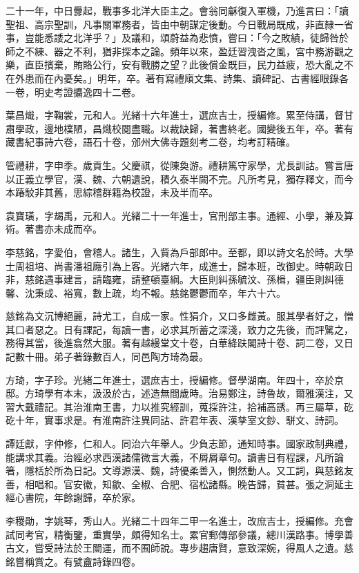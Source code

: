 \begin{pinyinscope}
二十一年，中日釁起，戰事多北洋大臣主之。會翁同龢復入軍機，乃進言曰：「讀聖祖、高宗聖訓，凡事關軍務者，皆由中朝謀定後動。今日戰局既成，非直隸一省事，豈能悉諉之北洋乎？」及議和，頌蔚益為悲憤，嘗曰：「今之敗績，徒歸咎於師之不練、器之不利，猶非探本之論。頻年以來，盈廷習洩沓之風，宮中務游觀之樂，直臣擯棄，賄賂公行，安有戰勝之望？此後償金既巨，民力益疲，恐大亂之不在外患而在內憂矣。」明年，卒。著有寫禮廎文集、詩集、讀碑記、古書經眼錄各一卷，明史考證攟逸四十二卷。

葉昌熾，字鞠裳，元和人。光緒十六年進士，選庶吉士，授編修。累至侍講，督甘肅學政，邊地樸陋，昌熾校閱盡職。以裁缺歸，著書終老。國變後五年，卒。著有藏書紀事詩六卷，語石十卷，邠州大佛寺題刻考二卷，均考訂精確。

管禮耕，字申季。歲貢生。父慶祺，從陳奐游。禮耕篤守家學，尤長訓詁。嘗言唐以正義立學官，漢、魏、六朝遺說，積久泰半闕不完。凡所考見，獨存釋文，而今本踳駮非其舊，思綜稽群籍為校證，未及半而卒。

袁寶璜，字朅禹，元和人。光緒二十一年進士，官刑部主事。通經、小學，兼及算術。著書亦未成而卒。

李慈銘，字愛伯，會稽人。諸生，入貲為戶部郎中。至都，即以詩文名於時。大學士周祖培、尚書潘祖廕引為上客。光緒六年，成進士，歸本班，改御史。時朝政日非，慈銘遇事建言，請臨雍，請整頓臺綱。大臣則糾孫毓汶、孫楫，疆臣則糾德馨、沈秉成、裕寬，數上疏，均不報。慈銘鬱鬱而卒，年六十六。

慈銘為文沉博絕麗，詩尤工，自成一家。性狷介，又口多雌黃。服其學者好之，憎其口者惡之。日有課記，每讀一書，必求其所蓄之深淺，致力之先後，而評騭之，務得其當，後進翕然大服。著有越縵堂文十卷，白華絳趺閣詩十卷、詞二卷，又日記數十冊。弟子著錄數百人，同邑陶方琦為最。

方琦，字子珍。光緒二年進士，選庶吉士，授編修。督學湖南。年四十，卒於京邸。方琦學有本末，汲汲於古，述造無間歲時。治易鄭注，詩魯故，爾雅漢注，又習大戴禮記。其治淮南王書，力以推究經訓，蒐採許注，拾補高誘。再三屬草，矻矻十年，實事求是。有淮南許注異同詁、許君年表、漢孳室文鈔、駢文、詩詞。

譚廷獻，字仲修，仁和人。同治六年舉人。少負志節，通知時事。國家政制典禮，能講求其義。治經必求西漢諸儒微言大義，不屑屑章句。讀書日有程課，凡所論箸，隱栝於所為日記。文導源漢、魏，詩優柔善入，惻然動人。又工詞，與慈銘友善，相唱和。官安徽，知歙、全椒、合肥、宿松諸縣。晚告歸，貧甚。張之洞延主經心書院，年餘謝歸，卒於家。

李稷勛，字姚琴，秀山人。光緒二十四年二甲一名進士，改庶吉士，授編修。充會試同考官，精衡鑒，重實學，頗得知名士。累官郵傳部參議，總川漢路事。博學善古文，嘗受詩法於王闓運，而不囿師說。專步趨唐賢，意致深婉，得風人之遺。慈銘嘗稱賞之。有甓盦詩錄四卷。


\end{pinyinscope}
